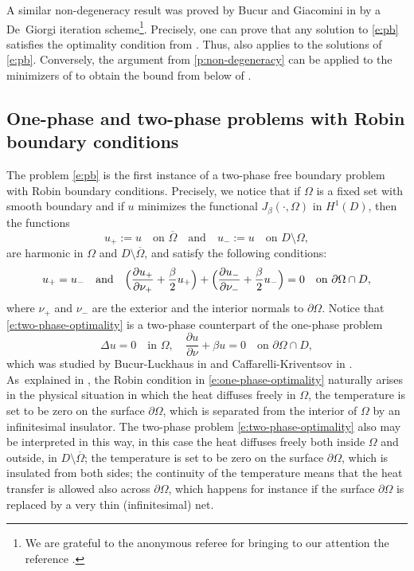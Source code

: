 \documentclass[11pt]{article}
\newcommand{\Subsection}{\subsection}
\numberwithin{equation}{section}
\theoremstyle{plain}
\theoremstyle{definition}
\begin{document}
A similar non-degeneracy result was proved by Bucur and Giacomini in \cite{bg} by a De~Giorgi iteration scheme\footnote{We are grateful to the anonymous referee for bringing to our attention the reference \cite{bg}.}. Precisely, one can prove that any solution to \eqref{e:pb} satisfies the optimality condition from \cite[Rem.\,3.7]{bg}. Thus, \cite[Th.\,3.5]{bg} also applies to the solutions of \eqref{e:pb}. Conversely, the argument from \ref{p:non-degeneracy} can be applied to the minimizers of \cite{bg} to obtain the bound from below of \cite[Th.\,3.5]{bg}.

\Subsection{One-phase and two-phase problems with Robin boundary conditions}
The problem \eqref{e:pb} is the first instance of a two-phase free boundary problem with Robin boundary conditions. Precisely, we notice that if $\Omega$ is a fixed set with smooth boundary and if $u$ minimizes the functional $J_\beta(\cdot,\Omega)$ in $H^1(D)$, then the functions
\[u_+:=u\quad\text{on } \overline\Omega\quad\text{and}\quad u_-:=u\quad\text{on } D\setminus\Omega,\]
are harmonic in $\Omega$ and $D\setminus\overline\Omega$, and satisfy the following conditions:
\begin{equation}\label{e:two-phase-optimality}
u_+=u_-\quad\text{and}\quad\Bigl(\frac{\partial u_+}{\partial \nu_+}+\frac\beta2 u_+\Bigr)+\Bigl(\frac{\partial u_-}{\partial \nu_-}+\frac\beta2u_-\Bigr)=0\quad\text{on } \partial\Omega\cap D,
\end{equation}
where $\nu_+$ and $\nu_-$ are the exterior and the interior normals to $\partial\Omega$. Notice that \eqref{e:two-phase-optimality} is a two-phase counterpart of the one-phase problem
\begin{equation}\label{e:one-phase-optimality}
\Delta u=0\quad\text{in }\Omega,\quad \frac{\partial u}{\partial \nu}+\beta u=0\quad\text{on } \partial\Omega\cap D,
\end{equation}
which was studied by Bucur-Luckhaus in \cite{bl} and Caffarelli-Kriventsov in \cite{ck}. As~\hbox{explained} in \cite{ck}, the Robin condition in \eqref{e:one-phase-optimality} naturally arises in the physical situation in which the heat diffuses freely in $\Omega$, the temperature is set to be zero on the surface $\partial\Omega$, which is separated from the interior of $\Omega$ by an infinitesimal insulator. The two-phase problem \eqref{e:two-phase-optimality} also may be interpreted in this way, in this case the heat diffuses freely both inside $\Omega$ and outside, in $D\setminus\overline\Omega$; the temperature is set to be zero on the surface $\partial\Omega$, which is insulated from both sides; the continuity of the temperature means that the heat transfer is allowed also across $\partial\Omega$, which happens for instance if the surface $\partial\Omega$ is replaced by a very thin (infinitesimal) net.
\end{document}
